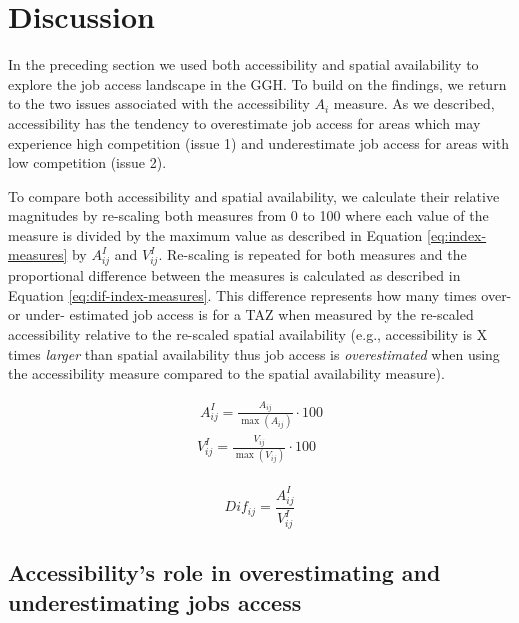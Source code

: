\documentclass[]{elsarticle} %
\begin{document}
\newpage

\hypertarget{discussion}{%
\section{Discussion}\label{discussion}}

In the preceding section we used both accessibility and spatial
availability to explore the job access landscape in the GGH. To build on
the findings, we return to the two issues associated with the
accessibility \(A_i\) measure. As we described, accessibility has the
tendency to overestimate job access for areas which may experience high
competition (issue 1) and underestimate job access for areas with low
competition (issue 2).

To compare both accessibility and spatial availability, we calculate
their relative magnitudes by re-scaling both measures from 0 to 100
where each value of the measure is divided by the maximum value as
described in Equation \ref{eq:index-measures} by \(A^I_{ij}\) and
\(V^I_{ij}\). Re-scaling is repeated for both measures and the
proportional difference between the measures is calculated as described
in Equation \ref{eq:dif-index-measures}. This difference represents how
many times over- or under- estimated job access is for a TAZ when
measured by the re-scaled accessibility relative to the re-scaled
spatial availability (e.g., accessibility is X times \emph{larger} than
spatial availability thus job access is \emph{overestimated} when using
the accessibility measure compared to the spatial availability measure).

\begin{equation}
\label{eq:index-measures}
\begin{array}{l}\
A^I_{ij} = \frac{A_{ij}}{\max(A_{ij})}\cdot100\\
V^I_{ij} = \frac{V_{ij}}{\max(V_{ij})}\cdot100\\
\end{array}
\end{equation}

\begin{equation}
\label{eq:dif-index-measures}
Dif_{ij} = \frac{A^I_{ij}}{V^I_{ij}}
\end{equation}

\hypertarget{accessibilitys-role-in-overestimating-and-underestimating-jobs-access}{%
\subsection{Accessibility's role in overestimating and underestimating
jobs
access}\label{accessibilitys-role-in-overestimating-and-underestimating-jobs-access}}
\end{document}
